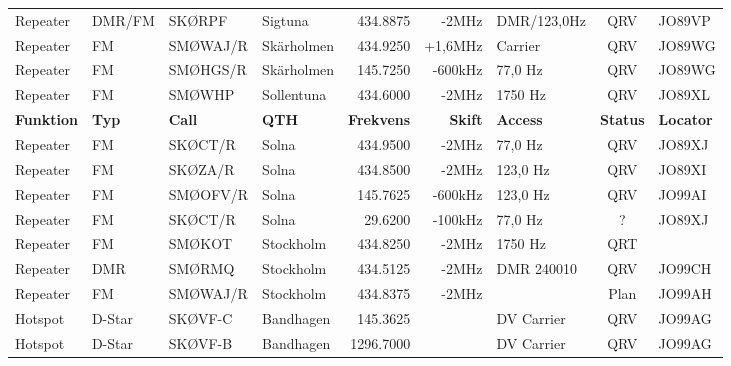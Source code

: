 \begin{landscape}
\begin{longtable}{llllrrlcl}
	Repeater          & DMR/FM       & SKØRPF        & Sigtuna      &          434.8875 &          -2MHz & DMR/123,0Hz    &       QRV       & JO89VP           \\
	Repeater          & FM           & SMØWAJ/R      & Skärholmen   &          434.9250 &        +1,6MHz & Carrier         &       QRV       & JO89WG           \\
	Repeater          & FM           & SMØHGS/R      & Skärholmen   &          145.7250 &        -600kHz & 77,0 Hz         &       QRV       & JO89WG           \\
	Repeater          & FM           & SMØWHP        & Sollentuna   &          434.6000 &          -2MHz & 1750 Hz         &       QRV       & JO89XL           \\
	\textbf{Funktion} & \textbf{Typ} & \textbf{Call} & \textbf{QTH} & \textbf{Frekvens} & \textbf{Skift} & \textbf{Access} & \textbf{Status} & \textbf{Locator} \\ \hline
	Repeater          & FM           & SKØCT/R       & Solna        &          434.9500 &          -2MHz & 77,0 Hz         &       QRV       & JO89XJ           \\
	Repeater          & FM           & SKØZA/R       & Solna        &          434.8500 &          -2MHz & 123,0 Hz        &       QRV       & JO89XI           \\
	Repeater          & FM           & SMØOFV/R      & Solna        &          145.7625 &        -600kHz & 123,0 Hz        &       QRV       & JO99AI           \\
Repeater          & FM           & SKØCT/R       & Solna        &           29.6200 &        -100kHz & 77,0 Hz         &        ?        & JO89XJ           \\
	Repeater          & FM           & SMØKOT        & Stockholm    &          434.8250 &          -2MHz & 1750 Hz         &       QRT       &  \\
	Repeater          & DMR          & SMØRMQ        & Stockholm    &          434.5125 &          -2MHz & DMR 240010      &       QRV       & JO99CH           \\
	Repeater          & FM           & SMØWAJ/R      & Stockholm    &          434.8375 &          -2MHz &                 &      Plan       & JO99AH           \\
	Hotspot           & D-Star       & SKØVF-C       & Bandhagen    &          145.3625 &                & DV Carrier      &       QRV       & JO99AG           \\
	Hotspot           & D-Star       & SKØVF-B       & Bandhagen    &         1296.7000 &                & DV Carrier      &       QRV       & JO99AG           \\

\end{longtable}
\end{landscape}
